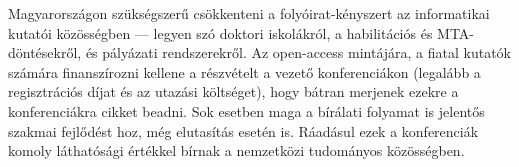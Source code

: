 \documentclass[12pt,a4paper]{article}
\begin{document}
Magyarországon szükségszerű csökkenteni a folyóirat-kényszert az informatikai kutatói közösségben — legyen szó doktori iskolákról, a habilitációs és MTA-döntésekről, és pályázati rendszerekről.
%
%
%
Az open-access mintájára, a fiatal kutatók számára finanszírozni kellene a részvételt a vezető konferenciákon (legalább a regisztrációs díjat és az utazási költséget), hogy bátran merjenek ezekre a konferenciákra cikket beadni. Sok esetben maga a bírálati folyamat is jelentős szakmai fejlődést hoz, még elutasítás esetén is. Ráadásul ezek a konferenciák komoly láthatósági értékkel bírnak a nemzetközi tudományos közösségben.

\end{document}
